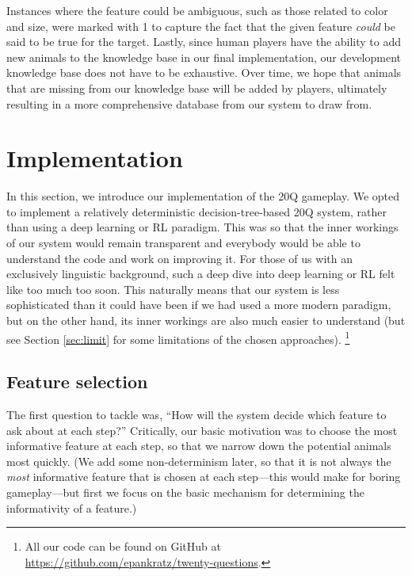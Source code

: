 \documentclass[11pt,a4paper]{article}
\begin{document}
{Instances where the feature could be ambiguous, such as those related to color and size, were marked with 1 to capture the fact that the given feature \textit{could} be said to be true for the target.
Lastly, since human players have the ability to add new animals to the knowledge base in our final implementation, our development knowledge base does not have to be exhaustive. 
Over time, we hope that animals that are missing from our knowledge base will be added by players, ultimately resulting in a more comprehensive database from our system to draw from.

\section{Implementation}
\label{sec:impl}

In this section, we introduce our implementation of the 20Q gameplay.
We opted to implement a relatively deterministic decision-tree-based 20Q system, rather than using a deep learning or RL paradigm.
This was so that the inner workings of our system would remain transparent and everybody would be able to understand the code and work on improving it.
For those of us with an exclusively linguistic background, such a deep dive into deep learning or RL felt like too much too soon.
This naturally means that our system is less sophisticated than it could have been if we had used a more modern paradigm, but on the other hand, its inner workings are also much easier to understand (but see Section \ref{sec:limit} for some limitations of the chosen approaches).%
    \footnote{All our code can be found on GitHub at \url{https://github.com/epankratz/twenty-questions}.}

\subsection{Feature selection}
\label{subsec:featselec}

The first question to tackle was, ``How will the system decide which feature to ask about at each step?''
Critically, our basic motivation was to choose the most informative feature at each step, so that we narrow down the potential animals most quickly.
(We add some non-determinism later, so that it is not always the \textit{most} informative feature that is chosen at each step---this would make for boring gameplay---but first we focus on the basic mechanism for determining the informativity of a feature.)

}
\end{document}
